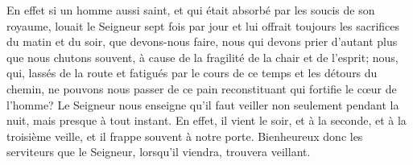 En effet si un homme aussi saint,
	et qui était absorbé par les soucis de son royaume,
	louait le Seigneur sept fois par jour
	et lui offrait toujours les sacrifices du matin et du soir,
	que devons-nous faire,
	nous qui devons prier d’autant plus que nous chutons souvent,
	à cause de la fragilité de la chair et de l’esprit;
	nous, qui, lassés de la route
		et fatigués par le cours de ce temps et les détours du chemin,
	ne pouvons nous passer de ce pain reconstituant
		qui fortifie le cœur de l’homme?
Le Seigneur nous enseigne qu’il faut veiller non seulement pendant la nuit,
	mais presque à tout instant.
En effet, il vient le soir, et à la seconde, et à la troisième veille,
	et il frappe souvent à notre porte.
Bienheureux donc les serviteurs
	que le Seigneur, lorsqu’il viendra, trouvera veillant.
